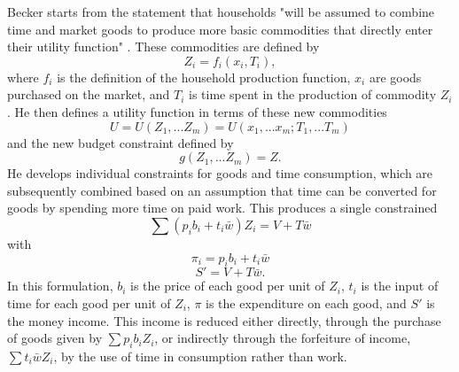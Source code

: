 Becker starts from the statement that households "will be assumed to combine time and market goods to produce more basic commodities that directly enter their utility function" \cite[p. 495]{Becker1965}. These commodities are defined by
\begin{equation}
	Z_i = f_i(x_i, T_i),
\end{equation}
where $f_i$ is the definition of the household production function, $x_i$ are goods purchased on the market, and $T_i$ is time spent in the production of commodity $Z_i$. He then defines a utility function in terms of these new commodities
\begin{equation}
	U = U(Z_1,...Z_m) = U(x_1,...x_m; T_1,...T_m)
\end{equation}
and the new budget constraint defined by
\begin{equation}
	g(Z_1,...Z_m) = Z.
\end{equation}
He develops individual constraints for goods and time consumption, which are subsequently combined based on an assumption that time can be converted for goods by spending more time on paid work. This produces a single constrained
\begin{equation}
	\sum(p_i b_i + t_i \bar{w})Z_i = V + T \bar{w}
\end{equation}
with
\begin{equation}
	\pi_i = p_i b_i + t_i \bar{w}
\end{equation}
\begin{equation}
	S' = V + T \bar{w}.
\end{equation}
In this formulation, $b_i$ is the price of each good per unit of $Z_i$, $t_i$ is the input of time for each good per unit of $Z_i$, $\pi$ is the expenditure on each good, and $S'$ is the money income. This income is reduced either directly, through the purchase of goods given by $\sum p_i b_i Z_i$, or indirectly through the forfeiture of income, $\sum t_i \bar{w} Z_i$, by the use of time in consumption rather than work.

